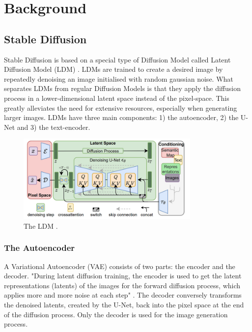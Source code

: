 \section{Background} \label{backgorund}



\subsection{Stable Diffusion}
Stable Diffusion is based on a special type of Diffusion Model called Latent Diffusion Model (LDM) \cite{Rombach_2022_CVPR}. LDMs are trained to create a desired image by repeatedly denoising an image initialised with random gaussian noise. What separates LDMs from regular Diffusion Models is that they apply the diffusion process in a lower-dimensional latent space instead of the pixel-space. This greatly alleviates the need for extensive resources, especially when generating larger images. LDMs have three main components: 1) the autoencoder, 2) the U-Net and 3) the text-encoder.
\begin{figure}[!htb]
\centering
\includegraphics[width=0.8\textwidth]
{static/LDM.png}
\caption{The LDM \cite[Fig.~3]{Rombach_2022_CVPR}.}
\label{fig:ldm}
\end{figure}



\subsubsection{The Autoencoder}
A Variational Autoencoder (VAE) consists of two parts: the encoder and the decoder. "During latent diffusion training, the encoder is used to get the latent representations (latents) of the images for the forward diffusion process, which applies more and more noise at each step" \cite{patil2022stable}. The decoder conversely transforms the denoised latents, created by the U-Net, back into the pixel space at the end of the diffusion process. Only the decoder is used for the image generation process.




